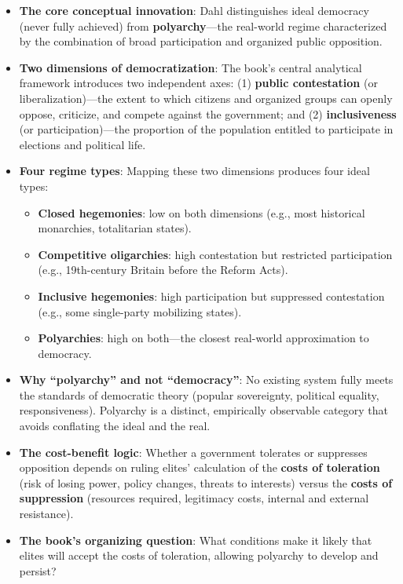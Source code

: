 \documentclass[12pt]{article}
\begin{document}
\begin{itemize}[leftmargin=*, itemsep=4pt]
    \item \textbf{The core conceptual innovation}: Dahl distinguishes ideal democracy (never fully achieved) from \textbf{polyarchy}---the real-world regime characterized by the combination of broad participation and organized public opposition.
    \item \textbf{Two dimensions of democratization}: The book's central analytical framework introduces two independent axes: (1) \textbf{public contestation} (or liberalization)---the extent to which citizens and organized groups can openly oppose, criticize, and compete against the government; and (2) \textbf{inclusiveness} (or participation)---the proportion of the population entitled to participate in elections and political life.
    \item \textbf{Four regime types}: Mapping these two dimensions produces four ideal types:
        \begin{itemize}
            \item \textbf{Closed hegemonies}: low on both dimensions (e.g., most historical monarchies, totalitarian states).
            \item \textbf{Competitive oligarchies}: high contestation but restricted participation (e.g., 19th-century Britain before the Reform Acts).
            \item \textbf{Inclusive hegemonies}: high participation but suppressed contestation (e.g., some single-party mobilizing states).
            \item \textbf{Polyarchies}: high on both---the closest real-world approximation to democracy.
        \end{itemize}
    \item \textbf{Why ``polyarchy'' and not ``democracy''}: No existing system fully meets the standards of democratic theory (popular sovereignty, political equality, responsiveness). Polyarchy is a distinct, empirically observable category that avoids conflating the ideal and the real.
    \item \textbf{The cost-benefit logic}: Whether a government tolerates or suppresses opposition depends on ruling elites' calculation of the \textbf{costs of toleration} (risk of losing power, policy changes, threats to interests) versus the \textbf{costs of suppression} (resources required, legitimacy costs, internal and external resistance).
    \item \textbf{The book's organizing question}: What conditions make it likely that elites will accept the costs of toleration, allowing polyarchy to develop and persist?

\end{itemize}
\end{document}
